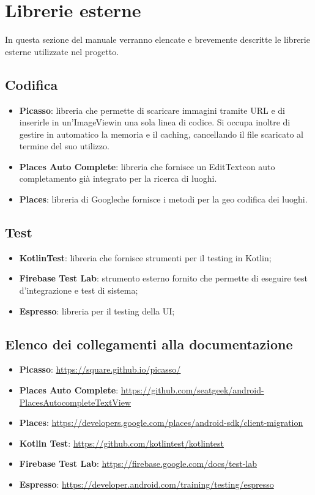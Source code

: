 \section{Librerie esterne}
In questa sezione del manuale verranno elencate e brevemente descritte le librerie esterne utilizzate nel progetto.
\subsection{Codifica}
\begin{itemize}
	\item \textbf{Picasso}: libreria che permette di scaricare immagini tramite URL e di inserirle in un'ImageView\glosp in una sola linea di codice. Si occupa inoltre di gestire in automatico la memoria e il caching, cancellando il file scaricato al termine del suo utilizzo.
	\item \textbf{Places Auto Complete}: libreria che fornisce un EditText\glosp con auto completamento già integrato per la ricerca di luoghi.
	\item \textbf{Places}: libreria di Google\glosp che fornisce i metodi per la geo codifica dei luoghi.
\end{itemize}
\subsection{Test}
\begin{itemize}
	\item \textbf{KotlinTest}: libreria che fornisce strumenti per il testing in Kotlin\glo;
	\item \textbf{Firebase Test Lab}: strumento esterno fornito che permette di eseguire test d'integrazione e test di sistema;
	\item \textbf{Espresso}: libreria per il testing della UI;
\end{itemize}
\subsection{Elenco dei collegamenti alla documentazione}
\begin{itemize}
	\item \textbf{Picasso}: \url{https://square.github.io/picasso/}
	\item \textbf{Places Auto Complete}:
	\url{https://github.com/seatgeek/android-PlacesAutocompleteTextView}
	\item \textbf{Places}:
	\url{https://developers.google.com/places/android-sdk/client-migration}
	\item \textbf{Kotlin Test}:
	\url{https://github.com/kotlintest/kotlintest}
	\item \textbf{Firebase Test Lab}:
	\url{https://firebase.google.com/docs/test-lab}
	\item \textbf{Espresso}:
	\url{https://developer.android.com/training/testing/espresso}
\end{itemize}